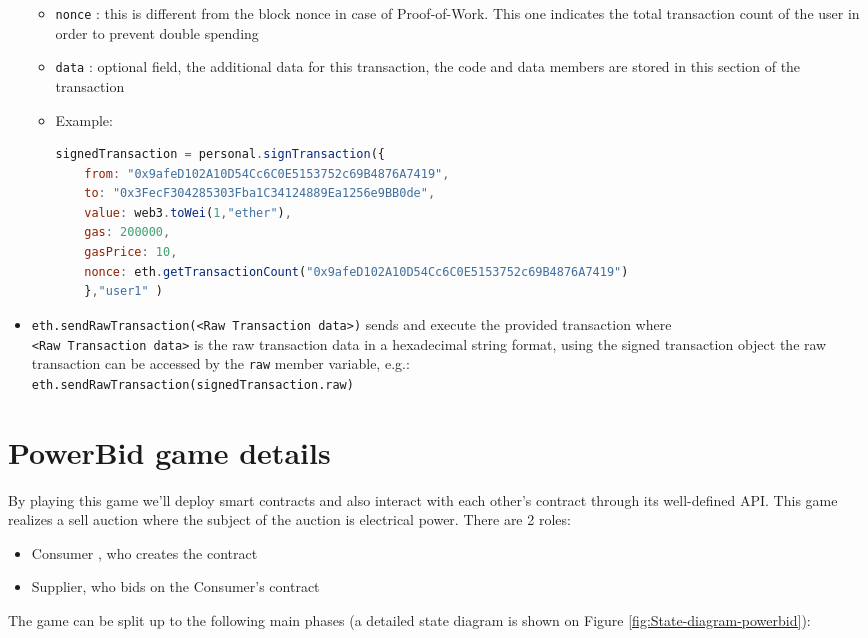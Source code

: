 \documentclass[a4paper]{article}
\begin{document}
\begin{itemize}
\begin{itemize}
\item \verb!nonce! : this is different from the block nonce in case of Proof-of-Work. This one indicates the total transaction count of the user in order to prevent double spending

\item \verb!data! : optional field, the additional data for this transaction, the code and data members are stored in this section of the transaction

\item Example:
\begin{lstlisting}[language=javascript]
signedTransaction = personal.signTransaction({
    from: "0x9afeD102A10D54Cc6C0E5153752c69B4876A7419",
    to: "0x3FecF304285303Fba1C34124889Ea1256e9BB0de",
    value: web3.toWei(1,"ether"),
    gas: 200000, 
    gasPrice: 10,
    nonce: eth.getTransactionCount("0x9afeD102A10D54Cc6C0E5153752c69B4876A7419")
    },"user1" )
\end{lstlisting}

\end{itemize}

\item \verb!eth.sendRawTransaction(<Raw Transaction data>)! sends and execute the  provided transaction where \\ \verb!<Raw Transaction data>! is the raw transaction data in a hexadecimal string format, using the signed transaction object the raw transaction can be accessed by the \verb!raw! member variable, e.g.: \\ \verb!eth.sendRawTransaction(signedTransaction.raw)!

\end{itemize}


\section{PowerBid game details}

By playing this game we'll deploy smart contracts and also interact with each other's contract through its well-defined API. This game realizes a sell auction where the subject of the auction is electrical power. There are 2 roles:
\begin{itemize}
\item Consumer , who creates the contract
\item Supplier, who bids on the Consumer's contract
\end{itemize}

The game can be split up to the following main phases (a detailed state diagram is shown on Figure \ref{fig:State-diagram-powerbid}):
\end{document}

